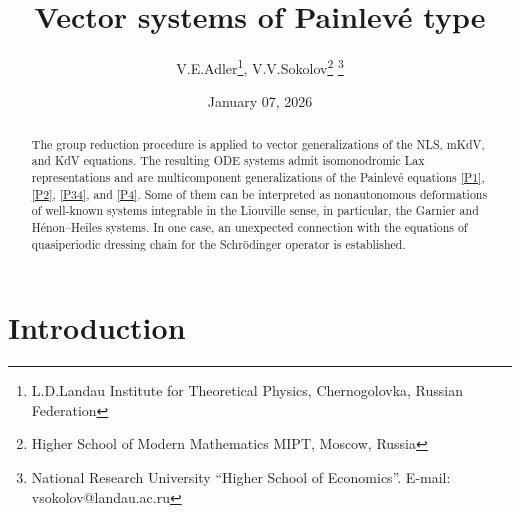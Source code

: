 \documentclass[11pt]{article}
\title{Vector systems of Painlev\'e type}
\author{V.E.\:Adler\thanks{L.D.\:Landau Institute for Theoretical Physics, Chernogolovka, Russian Federation},\quad 
V.V.\:Sokolov\thanks{Higher School of Modern Mathematics MIPT, Moscow, Russia} \thanks{National Research University ``Higher School of Economics''. E-mail: vsokolov@landau.ac.ru}}
\date{January 07, 2026}
\theoremstyle{plain}
\theoremstyle{definition}
\begin{document}
\maketitle

\begin{abstract}
The group reduction procedure is applied to vector generalizations of the NLS, mKdV, and KdV equations. The resulting ODE systems admit isomonodromic Lax representations and are multicomponent generalizations of the Painlev\'e equations \ref*{P1}, \ref*{P2}, \ref*{P34}, and \ref*{P4}. Some of them can be interpreted as nonautonomous deformations of well-known systems integrable in the Liouville sense, in particular, the Garnier and H\'enon--Heiles systems. In one case, an unexpected connection with the equations of quasiperiodic dressing chain for the Schr\"odinger operator is established.
\end{abstract}


\section{Introduction}
\end{document}
